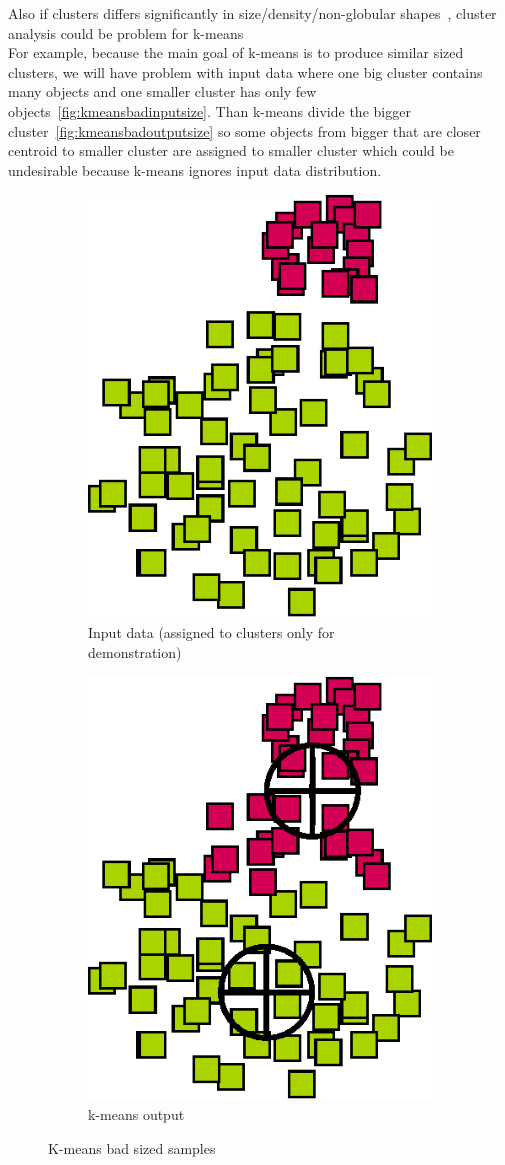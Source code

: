 Also if clusters differs significantly in size/density/non-globular shapes~\cite{Tan05}, cluster analysis could be problem for k-means\\
For example, because the main goal of k-means is to produce similar sized clusters, we will have problem with input data where one big cluster contains many objects and one smaller cluster has only few objects~\autoref{fig:kmeansbadinputsize}. Than k-means divide the bigger cluster~\autoref{fig:kmeansbadoutputsize} so some objects from bigger that are closer centroid to smaller cluster are assigned to smaller cluster which could be undesirable because k-means ignores input data distribution.%
\begin{figure}[h]
\centering
\begin{subfigure}{.49\textwidth}
  \centering
  \includegraphics[width=.5\linewidth]{img/kmeans_badInputSampleSize.eps}
  \caption{Input data (assigned to clusters only for demonstration)}
  \label{fig:kmeansbadinputsize}
\end{subfigure}
\begin{subfigure}{.49\textwidth}
  \centering
  \includegraphics[width=.5\linewidth]{img/kmeans_badOutputSampleSize.eps}
  \caption{k-means output}
  \label{fig:kmeansbadoutputsize}
\end{subfigure}
\caption{K-means bad sized samples}
\end{figure}

